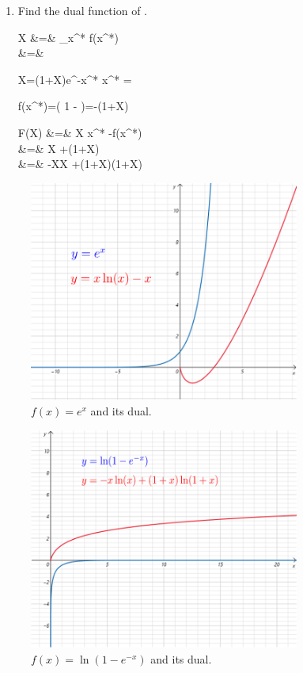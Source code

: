 \begin{enumerate}
\hrule

\item
Find the dual function of
\beq
{}
\;.
\eeq

\beqa
X
&=&
\partial_{x^*} f(x^*)
\\
&=&
\eeqa

\beq
X=(1+X)e^{-x^*}
\eeq
\beq
x^* = \ln{}
\eeq

\beq
f(x^*)=\ln\left(
1 - 
\right)=-\ln(1+X)
\eeq

\beqa
F(X) &=& X x^* -f(x^*)
\\
&=&
X \ln{}
+\ln(1+X)
\\
&=&
-X\ln  X
+(1+X)\ln(1+X)
\eeqa
\end{enumerate}


\begin{figure}[h!]
\centering
\includegraphics[width=3.5in]
{var-bay-medical/dual-ex.png}
\caption{$f(x)=e^x$ and its dual.}
\label{fig-dual-ex}
\end{figure}

\begin{figure}[h!]
\centering
\includegraphics[width=3.5in]
{var-bay-medical/dual-ln-1-e-x.png}
\caption{$f(x)=\ln(1-e^{-x})$ and its dual.}
\label{fig-dual-dual-ln-1-e-x}
\end{figure}



